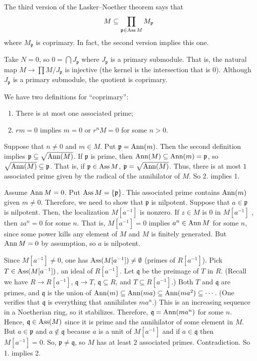 \documentclass [11 pt, oneside] {article}
\begin{document}
The third version of the Lasker--Noether theorem says that
\begin{align*}
	M \subseteq \prod_{\mathfrak{p}\in \operatorname{Ass} M} M_{\mathfrak{p}}
\end{align*}
where $M_{\mathfrak{p}}$ is coprimary. In fact, the second version implies this one. 

Take $N=0$, so $0 = \bigcap J_{\mathfrak{p} }$ where $J_{\mathfrak{p}}$ is a primary submodule. That is, the natural map $M \longrightarrow \prod M/J_{\mathfrak{p}}$ is injective (the kernel is the intersection that is $0$). Although $J_{\mathfrak{p}}$ is a primary submodule, the quotient is coprimary.

We have two definitions for ``coprimary'':
\begin{enumerate}
	\item There is at most one associated prime;
	\item $rm = 0$ implies $m=0$ or $r^nM=0$ for some $n>0$.
\end{enumerate}

Suppose that $n\ne 0$ and $m\in M$. Put $\mathfrak{p} = \operatorname{Ann}(m)$. Then the second definition implies $\mathfrak{p} \subseteq \sqrt{\operatorname{Ann} (M)} $. If $\mathfrak{p}$ is prime, then $\operatorname{Ann}(M)\subseteq \operatorname{Ann} (m)= \mathfrak{p}$, so $\sqrt{\operatorname{Ann}(M)}\subseteq \mathfrak{p} $. That is, if $\mathfrak{p}\in \operatorname{Ass} M$, $\mathfrak{p} = \sqrt{\operatorname{Ann} (M)} $. Thus, there is at most $1$ associated prime given by the radical of the annihilator of $M$. So 2. implies 1.

Assume $\operatorname{Ann} M=0$. Put $\operatorname{Ass} M = \{\mathfrak{p}\}$. This associated prime contains $\operatorname{Ann} (m)$ given $m\ne 0$. Therefore, we need to show that $\mathfrak{p}$ is nilpotent. Suppose that $a\in \mathfrak{p}$ is nilpotent. Then, the localization $M[a^{-1}]$ is nonzero. If $z\in M$ is $0$ in $M[a^{-1}]$ , then $za^n=0$ for some $n$. That is, $M[a^{-1}]=0$ implies $a^n \in \operatorname{Ann} M$ for some $n$, since some power kills any element of $M$ and $M$ is finitely generated. But $\operatorname{Ann} M=0$ by assumption, so $a$ is nilpotent. 

Since $M[a^{-1}]\ne 0$, one has $\operatorname{Ass} (M[a^{-1}])\ne \emptyset$ (primes of $R[a^{-1}]$). Pick $T\in \operatorname{Ass} (M[a^{-1}])$, an ideal of $R[a^{-1}]$. Let $\mathfrak{q}$ be the preimage of $T$ in $R$. (Recall we have $R\longrightarrow  R[a^{-1}]$, $\mathfrak{q}\longrightarrow T$, $\mathfrak{q}\subseteq R$, and $T\subseteq R[a^{-1}]$.) Both $T$ and $\mathfrak{q}$ are primes, and $\mathfrak{q}$ is the union of $\operatorname{Ann}(m)\subseteq \operatorname{Ann} (ma)\subseteq \operatorname{Ann} (ma^2)\subseteq \cdots$. (One verifies that $\mathfrak{q}$ is everything that annihilates $ma^n$.) This is an increasing sequence in a Noetherian ring, so it stabilizes. Therefore, $\mathfrak{q}=\operatorname{Ann}(ma^n)$ for some $n$. Hence, $\mathfrak{q}\in \operatorname{Ass}(M)$ since it is prime and the annihilator of some element in $M$. But $a\in \mathfrak{p}$ and $a\notin \mathfrak{q}$ because $a$ is a unit of $M[a^{-1}]$ and if $a\in \mathfrak{q}$ then $M[a^{-1}]=0$. So, $\mathfrak{p}\ne \mathfrak{q}$, so $M$ has at least $2$ associated primes. Contradiction. So 1. implies 2.
\end{document}

